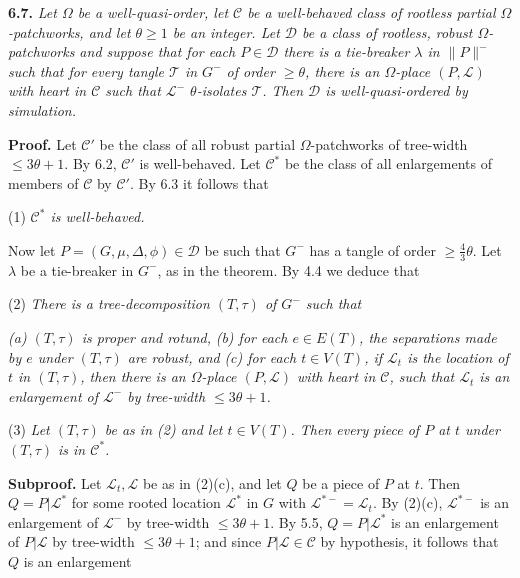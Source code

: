 \textbf{6.7.} \textit{Let $\Omega$ be a well-quasi-order, let $\mathscr{C}$ be a well-behaved class of rootless partial $\Omega$-patchworks, and let $\theta \ge 1$ be an integer. Let $\mathscr{D}$ be a class of rootless, robust $\Omega$-patchworks and suppose that for each $P \in \mathscr{D}$ there is a tie-breaker $\lambda$ in $\|P\|^-$ such that for every tangle $\mathscr{T}$ in $G^-$ of order $\ge \theta$, there is an $\Omega$-place $(P, \mathscr{L})$ with heart in $\mathscr{C}$ such that $\mathscr{L}^-$ $\theta$-isolates $\mathscr{T}$. Then $\mathscr{D}$ is well-quasi-ordered by simulation.}

\textbf{Proof.} Let $\mathscr{C}'$ be the class of all robust partial $\Omega$-patchworks of tree-width $\le 3\theta + 1$. By 6.2, $\mathscr{C}'$ is well-behaved. Let $\mathscr{C}^*$ be the class of all enlargements of members of $\mathscr{C}$ by $\mathscr{C}'$. By 6.3 it follows that

\hspace*{12pt}(1) \textit{$\mathscr{C}^*$ is well-behaved.}

Now let $P = (G, \mu, \Delta, \phi) \in \mathscr{D}$ be such that $G^-$ has a tangle of order $\ge \frac{4}{3}\theta$. Let $\lambda$ be a tie-breaker in $G^-$, as in the theorem. By 4.4 we deduce that

\hspace*{12pt}(2) \textit{There is a tree-decomposition $(T, \tau)$ of $G^-$ such that}

\textit{(a) $(T, \tau)$ is proper and rotund,} \textit{(b) for each $e \in E(T)$, the separations made by $e$ under $(T, \tau)$ are robust, and} \textit{(c) for each $t \in V(T)$, if $\mathscr{L}_t$ is the location of $t$ in $(T, \tau)$, then there is an $\Omega$-place $(P, \mathscr{L})$ with heart in $\mathscr{C}$, such that $\mathscr{L}_t$ is an enlargement of $\mathscr{L}^-$ by tree-width $\le 3\theta + 1$.}

\hspace*{12pt}(3) \textit{Let $(T, \tau)$ be as in (2) and let $t \in V(T)$. Then every piece of $P$ at $t$ under $(T, \tau)$ is in $\mathscr{C}^*$.}

\textbf{Subproof.} Let $\mathscr{L}_t, \mathscr{L}$ be as in (2)(c), and let $Q$ be a piece of $P$ at $t$. Then $Q = P|\mathscr{L}^*$ for some rooted location $\mathscr{L}^*$ in $G$ with $\mathscr{L}^{*-} = \mathscr{L}_t$. By (2)(c), $\mathscr{L}^{*-}$ is an enlargement of $\mathscr{L}^-$ by tree-width $\le 3\theta + 1$. By 5.5, $Q = P|\mathscr{L}^*$ is an enlargement of $P|\mathscr{L}$ by tree-width $\le 3\theta + 1$; and since $P|\mathscr{L} \in \mathscr{C}$ by hypothesis, it follows that $Q$ is an enlargement
